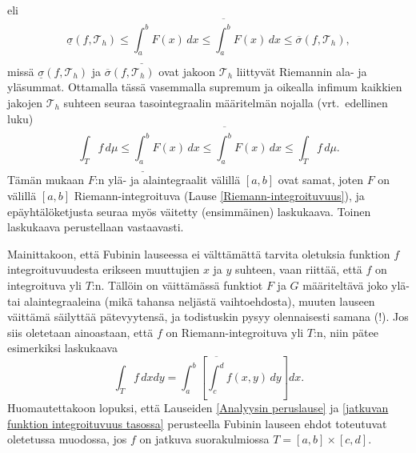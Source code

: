 eli
\[ 
\underline{\sigma}(f,\mathcal{T}_h) \le \underline{\int_a^b}F(x)\,dx 
                    \le \overline{\int_a^b}F(x)\,dx \le \overline{\sigma}(f,\mathcal{T}_h), 
\]
missä $\underline{\sigma}(f,\mathcal{T}_h)$ ja $\overline{\sigma}(f,\mathcal{T}_h)$ ovat
jakoon $\mathcal{T}_h$  liittyvät Riemannin ala- ja yläsummat. Ottamalla tässä vasemmalla
supremum ja oikealla infimum kaikkien jakojen $\mathcal{T}_h$ suhteen seuraa tasointegraalin
määritelmän nojalla (vrt.\ edellinen luku)
\[ 
\int_T f\,d\mu \le \underline{\int_a^b}F(x)\,dx \le \overline{\int_a^b}F(x)\,dx 
                                                \le \int_T f\,d\mu. 
\]
Tämän mukaan $F$:n ylä- ja alaintegraalit välillä $[a,b]$ ovat samat, joten $F$ on välillä
$[a,b]$ Riemann-integroituva (Lause \ref{Riemann-integroituvuus}), ja epäyhtälöketjusta seuraa
myös väitetty (ensimmäinen) laskukaava. Toinen laskukaava perustellaan vastaavasti.  

Mainittakoon, että Fubinin lauseessa ei välttämättä tarvita oletuksia funktion $f$ 
integroituvuudesta erikseen muuttujien $x$ ja $y$ suhteen, vaan riittää, että $f$ on 
integroituva yli $T$:n. Tällöin on väittämässä funktiot $F$ ja $G$ määriteltävä joko ylä- tai
alaintegraaleina (mikä tahansa neljästä vaihtoehdosta), muuten lauseen väittämä säilyttää 
pätevyytensä, ja todistuskin pysyy olennaisesti samana (!). Jos siis oletetaan ainoastaan, että
$f$ on Riemann-integroituva yli $T$:n, niin pätee esimerkiksi laskukaava
\[ 
\int_T f\,dxdy = \int_a^b\left[\overline{\int_c^d} f(x,y)\,dy\right]dx. 
\]
Huomautettakoon lopuksi, että Lauseiden \ref{Analyysin peruslause} ja
\ref{jatkuvan funktion integroituvuus tasossa} perusteella Fubinin lauseen ehdot toteutuvat
oletetussa muodossa, jos $f$ on jatkuva suorakulmiossa $T=[a,b]\times[c,d]$.

